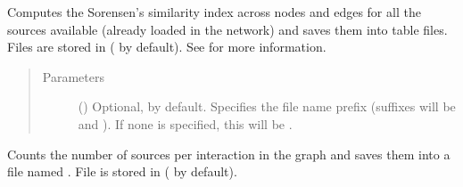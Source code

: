 \documentclass[letterpaper,10pt,english]{sphinxmanual}
\begin{document}
\begin{fulllineitems}
\begin{fulllineitems}
\label{\detokenize{reference:pypath.main.PyPath.source_similarity}}
Computes the Sorensen’s similarity index across nodes and edges
for all the sources available (already loaded in the network)
and saves them into table files. Files are stored in
 ( by default).
See {\hyperref[\detokenize{reference:pypath.main.PyPath.databases_similarity}]{}} for more
information.
\begin{quote}\begin{description}
\item[{Parameters}] \leavevmode
{} () \textendash{} Optional,  by default. Specifies the file name
prefix (suffixes will be  and ). If
none is specified, this will be
.

\end{description}\end{quote}

\end{fulllineitems}


\begin{fulllineitems}
\label{\detokenize{reference:pypath.main.PyPath.source_stats}}
\end{fulllineitems}


\begin{fulllineitems}
\label{\detokenize{reference:pypath.main.PyPath.sources_hist}}
Counts the number of sources per interaction in the graph and
saves them into a file named . File is stored in
 ( by
default).


\end{fulllineitems}
\end{fulllineitems}
\end{document}

